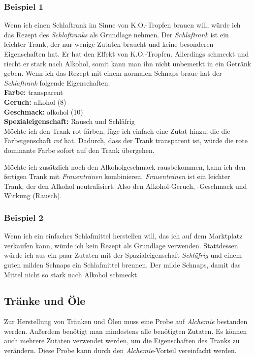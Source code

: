 \subsubsection{Beispiel 1}
Wenn ich einen Schlaftrank im Sinne von K.O.-Tropfen brauen will, würde ich das Rezept des \textit{Schlaftranks} als Grundlage nehmen. Der \textit{Schlaftrank} ist ein leichter Trank, der nur wenige Zutaten braucht und keine besonderen Eigenschaften hat. Er hat den Effekt von K.O.-Tropfen. Allerdings schmeckt und riecht er stark nach Alkohol, somit kann man ihn nicht unbemerkt in ein Getränk geben. Wenn ich das Rezept mit einem normalen Schnaps braue hat der \textit{Schlaftrank} folgende Eigenschaften:\\
\textbf{Farbe:} transparent \\
\textbf{Geruch:} alkohol (8) \\
\textbf{Geschmack:} alkohol (10) \\
\textbf{Spezialeigenschaft:} Rausch und Schläfrig \\

Möchte ich den Trank rot färben, füge ich einfach eine Zutat hinzu, die die Farbeigenschaft \textit{rot} hat. Dadurch, dass der Trank transparent ist, würde die rote dominante Farbe sofort auf den Trank übergehen. 

Möchte ich zusätzlich noch den Alkoholgeschmack rausbekommen, kann ich den fertigen Trank mit \textit{Frauentränen} kombinieren. \textit{Frauentränen} ist ein leichter Trank, der den Alkohol neutralisiert. Also den Alkohol-Geruch, -Geschmack und Wirkung (Rausch). 

\subsubsection{Beispiel 2}
Wenn ich ein einfaches Schlafmittel herstellen will, das ich auf dem Marktplatz verkaufen kann, würde ich kein Rezept als Grundlage verwenden. Stattdessen würde ich aus ein paar Zutaten mit der Spazialeigenschaft \textit{Schläfrig} und einem guten milden Schnaps ein Schlafmittel brennen. Der milde Schnaps, damit das Mittel nicht so stark nach Alkohol schmeckt. 

\subsection{Tränke und Öle}
Zur Herstellung von Tränken und Ölen muss eine Probe auf \textit{Alchemie} bestanden werden. Außerdem benötigt man mindestens alle benötigten Zutaten. Es können auch mehrere Zutaten verwendet werden, um die Eigenschaften des Tranks zu verändern. Diese Probe kann durch den \textit{Alchemie}-Vorteil vereinfacht werden.

